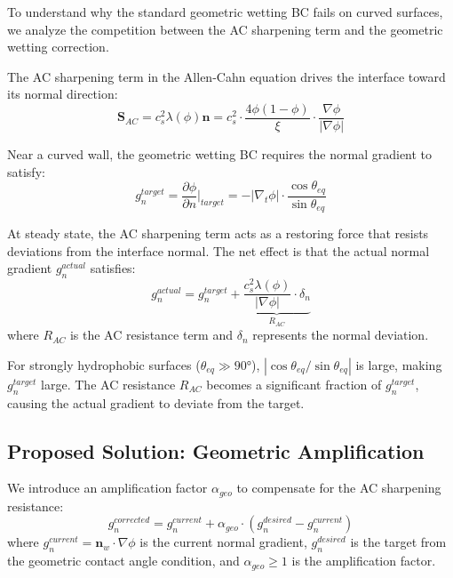 To understand why the standard geometric wetting BC fails on curved surfaces, we analyze the competition between the AC sharpening term and the geometric wetting correction.

The AC sharpening term in the Allen-Cahn equation drives the interface toward its normal direction:
\begin{equation}\label{eq:ac_source}
    \mathbf{S}_{AC} = c_s^2 \lambda(\phi) \mathbf{n} = c_s^2 \cdot \frac{4\phi(1-\phi)}{\xi} \cdot \frac{\nabla\phi}{|\nabla\phi|}
\end{equation}

Near a curved wall, the geometric wetting BC requires the normal gradient to satisfy:
\begin{equation}\label{eq:wetting_target}
    g_n^{target} = \frac{\partial\phi}{\partial n}\bigg|_{target} = -|\nabla_t\phi| \cdot \frac{\cos\theta_{eq}}{\sin\theta_{eq}}
\end{equation}

At steady state, the AC sharpening term acts as a restoring force that resists deviations from the interface normal. The net effect is that the actual normal gradient $g_n^{actual}$ satisfies:
\begin{equation}\label{eq:balance}
    g_n^{actual} = g_n^{target} + \underbrace{\frac{c_s^2 \lambda(\phi)}{|\nabla\phi|} \cdot \delta_n}_{R_{AC}}
\end{equation}
where $R_{AC}$ is the AC resistance term and $\delta_n$ represents the normal deviation.

For strongly hydrophobic surfaces ($\theta_{eq} \gg 90°$), $|\cos\theta_{eq}/\sin\theta_{eq}|$ is large, making $g_n^{target}$ large. The AC resistance $R_{AC}$ becomes a significant fraction of $g_n^{target}$, causing the actual gradient to deviate from the target.

\subsection{Proposed Solution: Geometric Amplification}

We introduce an amplification factor $\alpha_{geo}$ to compensate for the AC sharpening resistance:
\begin{equation}\label{eq:geo_amp}
    g_n^{corrected} = g_n^{current} + \alpha_{geo} \cdot (g_n^{desired} - g_n^{current})
\end{equation}
where $g_n^{current} = \mathbf{n}_w \cdot \nabla\phi$ is the current normal gradient, $g_n^{desired}$ is the target from the geometric contact angle condition, and $\alpha_{geo} \geq 1$ is the amplification factor.

